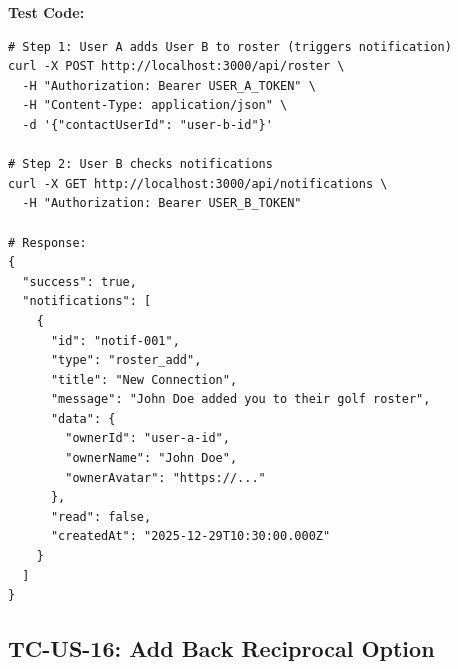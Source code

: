 \documentclass[11pt,a4paper]{article}
\begin{document}
\vspace{0.3cm}
\textbf{Test Code:}
\begin{lstlisting}
# Step 1: User A adds User B to roster (triggers notification)
curl -X POST http://localhost:3000/api/roster \
  -H "Authorization: Bearer USER_A_TOKEN" \
  -H "Content-Type: application/json" \
  -d '{"contactUserId": "user-b-id"}'

# Step 2: User B checks notifications
curl -X GET http://localhost:3000/api/notifications \
  -H "Authorization: Bearer USER_B_TOKEN"

# Response:
{
  "success": true,
  "notifications": [
    {
      "id": "notif-001",
      "type": "roster_add",
      "title": "New Connection",
      "message": "John Doe added you to their golf roster",
      "data": {
        "ownerId": "user-a-id",
        "ownerName": "John Doe",
        "ownerAvatar": "https://..."
      },
      "read": false,
      "createdAt": "2025-12-29T10:30:00.000Z"
    }
  ]
}
\end{lstlisting}

\vspace{0.5cm}


\subsection{TC-US-16: Add Back Reciprocal Option}
\end{document}
